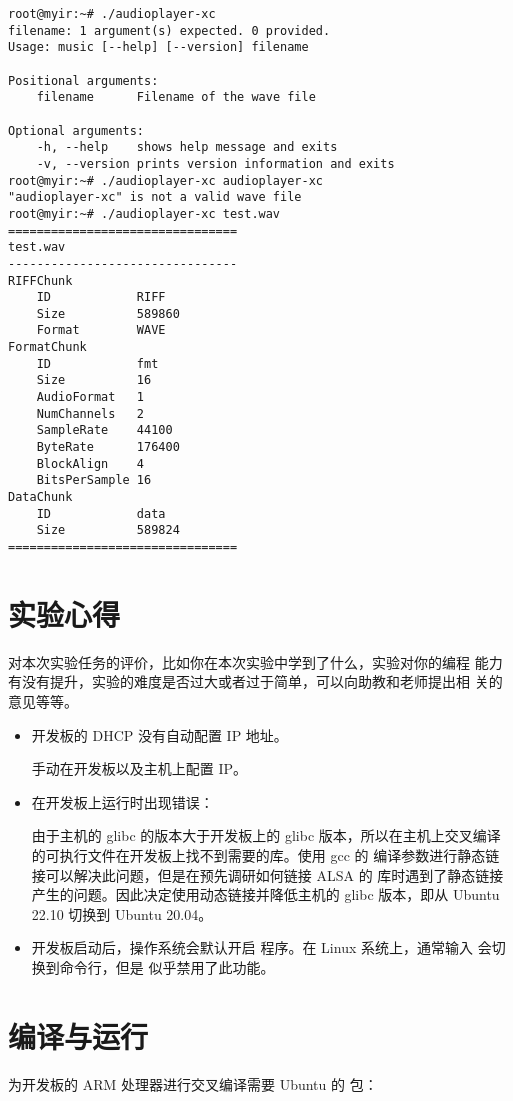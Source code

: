\begin{verbatim}
root@myir:~# ./audioplayer-xc 
filename: 1 argument(s) expected. 0 provided.
Usage: music [--help] [--version] filename

Positional arguments:
    filename      Filename of the wave file

Optional arguments:
    -h, --help    shows help message and exits
    -v, --version prints version information and exits
root@myir:~# ./audioplayer-xc audioplayer-xc 
"audioplayer-xc" is not a valid wave file
root@myir:~# ./audioplayer-xc test.wav 
================================
test.wav
--------------------------------
RIFFChunk
    ID            RIFF
    Size          589860
    Format        WAVE
FormatChunk
    ID            fmt
    Size          16
    AudioFormat   1
    NumChannels   2
    SampleRate    44100
    ByteRate      176400
    BlockAlign    4
    BitsPerSample 16
DataChunk
    ID            data
    Size          589824
================================
\end{verbatim}

\section{实验心得}

对本次实验任务的评价，比如你在本次实验中学到了什么，实验对你的编程
能力有没有提升，实验的难度是否过大或者过于简单，可以向助教和老师提出相
关的意见等等。



\begin{itemize}
    \item 开发板的 DHCP 没有自动配置 IP 地址。
    
    手动在开发板以及主机上配置 IP。

    \item 在开发板上运行时出现错误：
    
    
    由于主机的 glibc 的版本大于开发板上的 glibc 版本，所以在主机上交叉编译的可执行文件在开发板上找不到需要的库。使用 gcc 的  编译参数进行静态链接可以解决此问题，但是在预先调研如何链接 ALSA 的  库时遇到了静态链接产生的问题。因此决定使用动态链接并降低主机的 glibc 版本，即从 Ubuntu 22.10 切换到 Ubuntu 20.04。

    \item 开发板启动后，操作系统会默认开启  程序。在 Linux 系统上，通常输入  会切换到命令行，但是  似乎禁用了此功能。
    


\end{itemize}

\section{编译与运行}

为开发板的 ARM 处理器进行交叉编译需要 Ubuntu 的  包：